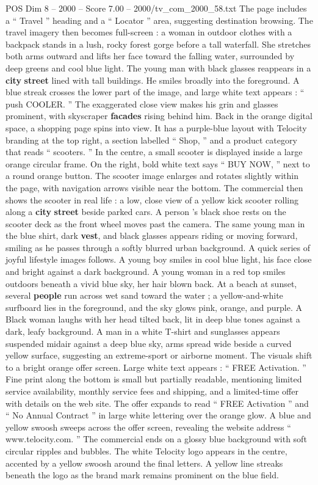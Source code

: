 \begin{textsample}{POS Dim 8 – 2000 – Score 7.00 – 2000/tv\_com\_2000\_58.txt}
The page includes a “ Travel ” heading and a “ Locator ” area, suggesting destination browsing.
The travel imagery then becomes full-screen : a woman in outdoor clothes with a backpack stands in a lush, rocky forest gorge before a tall waterfall.
She stretches both arms outward and lifts her face toward the falling water, surrounded by deep greens and cool blue light.
The young man with black glasses reappears in a \textbf{city} \textbf{street} lined with tall buildings.
He smiles broadly into the foreground.
A blue streak crosses the lower part of the image, and large white text appears : “ push COOLER. ” The exaggerated close view makes his grin and glasses prominent, with skyscraper \textbf{facades} rising behind him.
Back in the orange digital space, a shopping page spins into view.
It has a purple-blue layout with Telocity branding at the top right, a section labelled “ Shop, ” and a product category that reads “ scooters. ” In the centre, a small scooter is displayed inside a large orange circular frame.
On the right, bold white text says “ BUY NOW, ” next to a round orange button.
The scooter image enlarges and rotates slightly within the page, with navigation arrows visible near the bottom.
The commercial then shows the scooter in real life : a low, close view of a yellow kick scooter rolling along a \textbf{city} \textbf{street} beside parked cars.
A person ’s black shoe rests on the scooter deck as the front wheel moves past the camera.
The same young man in the blue shirt, dark \textbf{vest}, and black glasses appears riding or moving forward, smiling as he passes through a softly blurred urban background.
A quick series of joyful lifestyle images follows.
A young boy smiles in cool blue light, his face close and bright against a dark background.
A young woman in a red top smiles outdoors beneath a vivid blue sky, her hair blown back.
At a beach at sunset, several \textbf{people} run across wet sand toward the water ; a yellow-and-white surfboard lies in the foreground, and the sky glows pink, orange, and purple.
A Black woman laughs with her head tilted back, lit in deep blue tones against a dark, leafy background.
A man in a white T-shirt and sunglasses appears suspended midair against a deep blue sky, arms spread wide beside a curved yellow surface, suggesting an extreme-sport or airborne moment.
The visuals shift to a bright orange offer screen.
Large white text appears : “ FREE Activation. ” Fine print along the bottom is small but partially readable, mentioning limited service availability, monthly service fees and shipping, and a limited-time offer with details on the web site.
The offer expands to read “ FREE Activation ” and “ No Annual Contract ” in large white lettering over the orange glow.
A blue and yellow swoosh sweeps across the offer screen, revealing the website address “ www.telocity.com. ” The commercial ends on a glossy blue background with soft circular ripples and bubbles.
The white Telocity logo appears in the centre, accented by a yellow swoosh around the final letters.
A yellow line streaks beneath the logo as the brand mark remains prominent on the blue field.

\end{textsample}
